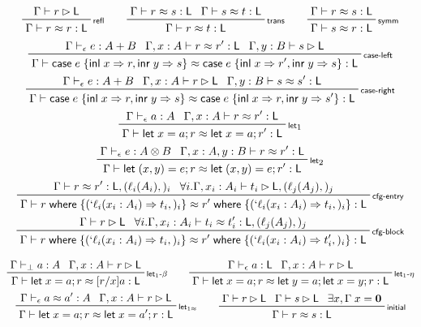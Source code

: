 \documentclass[acmsmall,screen,review]{acmart}
\newcommand{\mb}[1]{\ensuremath{\mathbf{#1}}}
\newcommand{\ms}[1]{\ensuremath{\mathsf{#1}}}
\newcommand{\lbl}[1]{{`#1}}
\newcommand{\lto}{\Rightarrow}
\newcommand{\linl}[1]{\ms{inl}\;{#1}}
\newcommand{\linr}[1]{\ms{inr}\;{#1}}
\newcommand{\caseexpr}[5]{\ms{case}\;#1\;\{\linl{#2} \lto #3, \linr{#4} \lto #5\}}
\newcommand{\letstmt}[3]{\ensuremath{\ms{let}\;#1 = #2; #3}}
\newcommand{\where}[2]{#1\;\ms{where}\;\{#2\}}
\newcommand{\wbranch}[3]{#1(#2) \lto #3}
\newcommand{\lwbranch}[3]{\wbranch{\lbl{#1}}{#2}{#3}}
\newcommand{\bhyp}[2]{#1 : #2}
\newcommand{\lhyp}[2]{#1(#2)}
\newcommand{\rle}[1]{{\scriptsize\textsf{#1}}}
\newcommand{\hasty}[4]{#1 \vdash_{#2} #3: {#4}}
\newcommand{\haslb}[3]{#1 \vdash #2 \rhd #3}
\newcommand{\teqv}{\approx}
\newcommand{\tmeq}[5]{#1 \vdash_{#2} #3 \teqv #4 : {#5}}
\newcommand{\lbeq}[4]{#1 \vdash #2 \teqv #3 : {#4}}
\begin{document}
\begin{gather*}
  \prftree[r]{\rle{refl}}{\haslb{\Gamma}{r}{\ms{L}}}{\lbeq{\Gamma}{r}{r}{\ms{L}}} \qquad
  \prftree[r]{\rle{trans}}{\lbeq{\Gamma}{r}{s}{\ms{L}}}{\lbeq{\Gamma}{s}{t}{\ms{L}}}
    {\lbeq{\Gamma}{r}{t}{\ms{L}}} \qquad
  \prftree[r]{\rle{symm}}{\lbeq{\Gamma}{r}{s}{\ms{L}}}{\lbeq{\Gamma}{s}{r}{\ms{L}}}
  \\
  \prftree[r]{\rle{case-left}}
    {\hasty{\Gamma}{\epsilon}{e}{A + B}}
    {\lbeq{\Gamma, \bhyp{x}{A}}{r}{r'}{\ms{L}}}
    {\haslb{\Gamma, \bhyp{y}{B}}{s}{\ms{L}}}
    {\lbeq{\Gamma}{\caseexpr{e}{x}{r}{y}{s}}{\caseexpr{e}{x}{r'}{y}{s}}{\ms{L}}}
  \\
  \prftree[r]{\rle{case-right}}
    {\hasty{\Gamma}{\epsilon}{e}{A + B}}
    {\haslb{\Gamma, \bhyp{x}{A}}{r}{\ms{L}}}
    {\lbeq{\Gamma, \bhyp{y}{B}}{s}{s'}{\ms{L}}}
    {\lbeq{\Gamma}{\caseexpr{e}{x}{r}{y}{s}}{\caseexpr{e}{x}{r}{y}{s'}}{\ms{L}}}
  \\
  \prftree[r]{\rle{let}$_1$}
    {\hasty{\Gamma}{\epsilon}{a}{A}}
    {\lbeq{\Gamma, \bhyp{x}{A}}{r}{r'}{\ms{L}}}
    {\lbeq{\Gamma}{\letstmt{x}{a}{r}}{\letstmt{x}{a}{r'}}{\ms{L}}}
  \\
  \prftree[r]{\rle{let}$_2$}
    {\hasty{\Gamma}{\epsilon}{e}{A \otimes B}}
    {\lbeq{\Gamma, \bhyp{x}{A}, \bhyp{y}{B}}{r}{r'}{\ms{L}}}
    {\lbeq{\Gamma}{\letstmt{(x, y)}{e}{r}}{\letstmt{(x, y)}{e}{r'}}{\ms{L}}}
  \\
  \prftree[r]{\rle{cfg-entry}}
    {\lbeq{\Gamma}{r}{r'}{\ms{L}, (\lhyp{\ell_i}{A_i},)_i}}
    {\forall i. \haslb{\Gamma, \bhyp{x_i}{A_i}}{t_i}{\ms{L}, (\lhyp{\ell_j}{A_j},)_j}}
    {\lbeq{\Gamma}
      {\where{r}{(\lwbranch{\ell_i}{x_i: A_i}{t_i},)_i}}
      {\where{r'}{(\lwbranch{\ell_i}{x_i: A_i}{t_i},)_i}}
      {\ms{L}}
    }
  \\
  \prftree[r]{\rle{cfg-block}}
    {\haslb{\Gamma}{r}{\ms{L}}}
    {\forall i. \lbeq{\Gamma, \bhyp{x_i}{A_i}}{t_i}{t_i'}{\ms{L}, (\lhyp{\ell_j}{A_j},)_j}}
    {\lbeq{\Gamma}
      {\where{r}{(\lwbranch{\ell_i}{x_i: A_i}{t_i},)_i}}
      {\where{r'}{(\lwbranch{\ell_i}{x_i: A_i}{t_i'},)_i}}
      {\ms{L}}
    }
\end{gather*}

\begin{gather*}
  \prftree[r]{\rle{let$_1$-$\beta$}}
    {\hasty{\Gamma}{\bot}{a}{A}}
    {\haslb{\Gamma, \bhyp{x}{A}}{r}{\ms{L}}}
    {\lbeq{\Gamma}{\letstmt{x}{a}{r}}{[r/x]a}{\ms{L}}}
  \qquad
  \prftree[r]{\rle{let$_1$-$\eta$}}
    {\hasty{\Gamma}{\epsilon}{a}{\ms{L}}}
    {\haslb{\Gamma, \bhyp{x}{A}}{r}{\ms{L}}}
    {\lbeq{\Gamma}{\letstmt{x}{a}{r}}{\letstmt{y}{a}{\letstmt{x}{y}{r}}}{\ms{L}}}
  \\
  \prftree[r]{\rle{let$_{1\approx}$}}
    {\tmeq{\Gamma}{\epsilon}{a}{a'}{A}}
    {\haslb{\Gamma, \bhyp{x}{A}}{r}{\ms{L}}}
    {\lbeq{\Gamma}{\letstmt{x}{a}{r}}{\letstmt{x}{a'}{r}}{\ms{L}}}
  \qquad
  \prftree[r]{\rle{initial}}
    {\haslb{\Gamma}{r}{\ms{L}}}
    {\haslb{\Gamma}{s}{\ms{L}}}
    {\exists x, \Gamma\;x = \mb{0}}
    {\lbeq{\Gamma}{r}{s}{\ms{L}}}
\end{gather*}
\end{document}
